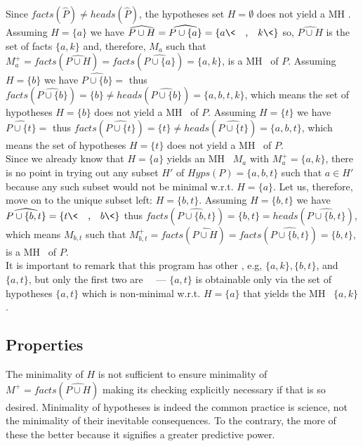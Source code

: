 \documentclass{llncs}
\begin{document}
{{			Since $facts(\widehat{P})\neq heads(\widehat{P})$, the hypotheses set $H=\emptyset$ does not yield a MH \m.		
			Assuming $H=\{a\}$ we have $\widehat{P\cup H}=\widehat{P\cup\{a\}}=\{a\<\textrm{\ \ \ ,\ \ \ } k\<\}$
so, $\widehat{P\cup H}$ is the set of facts $\{a,k\}$ and, therefore, $M_{a}$ such that 
			$M_{a}^{+}=facts(\widehat{P\cup H})=facts(\widehat{P\cup\{a\}})=\{a,k\}$, is a MH \m\ of $P$.
			Assuming $H=\{b\}$ we have $\widehat{P\cup\{b\}}=$
			thus $facts(\widehat{P\cup\{b\}})=\{b\}\neq heads(\widehat{P\cup\{b\}})=\{a,b,t,k\}$, which means the set of hypotheses $H=\{b\}$ does
			not yield a MH \m\ of $P$.
			Assuming $H=\{t\}$ we have $\widehat{P\cup\{t\}}=$
			thus $facts(\widehat{P\cup\{t\}})=\{t\}\neq heads(\widehat{P\cup\{t\}})=\{a,b,t\}$, which means the set of hypotheses $H=\{t\}$ does not
			yield a MH \m\ of $P$.\\			
			Since we already know that $H=\{a\}$ yields an MH \m\ $M_{a}$ with $M_{a}^{+}=\{a,k\}$, there is no point in trying out any subset $H'$ 
			of $Hyps(P)=\{a,b,t\}$ such that $a\in H'$ because any such subset would not be minimal w.r.t. $H=\{a\}$.
			Let us, therefore, move on to the unique subset left: $H=\{b,t\}$.
			Assuming $H=\{b,t\}$ we have $\widehat{P\cup\{b,t\}}=\{t\<\textrm{\ \ \ ,\ \ \ } b\<\}$
thus $facts(\widehat{P\cup\{b,t\}})=\{b,t\}=heads(\widehat{P\cup\{b,t\}})$, which means $M_{b,t}$ such that 
			$M_{b,t}^{+}=facts(\widehat{P\cup H})=facts(\widehat{P\cup\{b,t\}})=\{b,t\}$, is a MH \m\ of $P$.\\			
			It is important to remark that this program has other \cms, e.g, $\{a,k\}, \{b,t\}$, and $\{a,t\}$, but only the first two are \MH\ \ms\ --- $\{a,t\}$ is obtainable only via the set of hypotheses $\{a,t\}$ which is non-minimal w.r.t.
			$H=\{a\}$ that yields the MH \m\ $\{a,k\}$.
		}
		}
			
			
		\subsection{Properties}
			The minimality of $H$ is not sufficient to ensure minimality of $M^{+} = facts(\widehat{P\cup H})$ making its checking explicitly necessary
			if that is so desired.
			Minimality of hypotheses is indeed the common practice is science, not the minimality of their inevitable consequences.
			To the contrary, the more of these the better because it signifies a greater predictive power.
	
\end{document}
